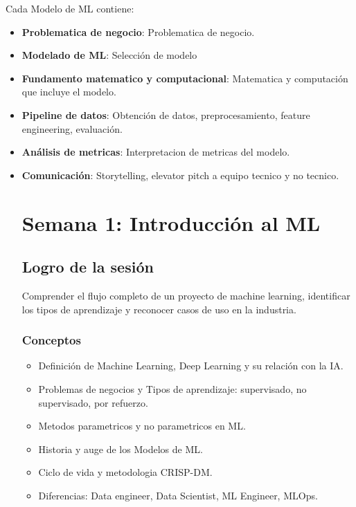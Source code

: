 \documentclass[12pt,a4paper,openany,oneside]{book}
\begin{document}
Cada Modelo de ML contiene:
\begin{itemize}
    \item \textbf{Problematica de negocio}: Problematica de negocio.
    \item \textbf{Modelado de ML}: Selección de modelo
    \item \textbf{Fundamento matematico y computacional}: Matematica y computación que incluye el modelo.
    \item \textbf{Pipeline de datos}: Obtención de datos, preprocesamiento, feature engineering, evaluación.
    \item \textbf{Análisis de metricas}: Interpretacion de metricas del modelo.
    \item \textbf{Comunicación}: Storytelling, elevator pitch a equipo tecnico y no tecnico.


\chapter{Semana 1: Introducción al ML}

\section{Logro de la sesión}
Comprender el flujo completo de un proyecto de machine learning, identificar los tipos de aprendizaje y reconocer casos de uso en la industria.

\subsection{Conceptos}
\begin{itemize}
    \item Definición de Machine Learning, Deep Learning y su relación con la IA.
    \item Problemas de negocios y Tipos de aprendizaje: supervisado, no supervisado, por refuerzo.
    \item Metodos parametricos y no parametricos en ML.
    \item Historia y auge de los Modelos de ML.
    \item Ciclo de vida y metodologia CRISP-DM.
    \item Diferencias: Data engineer, Data Scientist, ML Engineer, MLOps.
\end{itemize}


\end{itemize}
\end{document}
